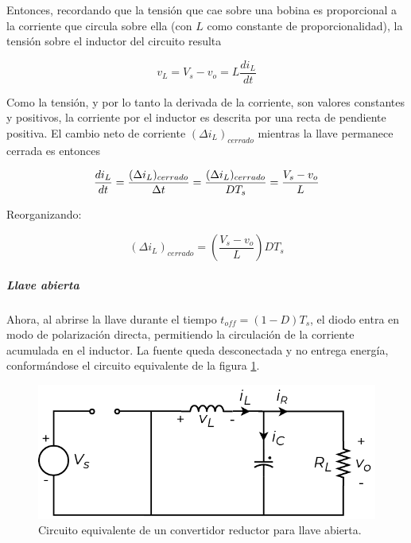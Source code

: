Entonces, recordando que la tensión que cae sobre una bobina es proporcional a la corriente que circula sobre ella (con $L$ como constante de proporcionalidad), la tensión sobre el inductor del circuito resulta

\begin{equation}\label{ec_tensionL_cerrada}
    v_L = V_s - v_o = L\frac{di_L}{dt}
\end{equation}

Como la tensión, y por lo tanto la derivada de la corriente, son valores constantes y positivos, la corriente por el inductor es descrita por una recta de pendiente positiva. El cambio neto de corriente $(\Delta i_L)_{cerrado}$ mientras la llave permanece cerrada es entonces

\begin{equation*}
    \frac{di_L}{dt} = \frac{(\Delta i_L)_{cerrado}}{\Delta t} = \frac{(\Delta i_L)_{cerrado}}{DT_s} = \frac{V_s - v_o}{L}\\
\end{equation*}

Reorganizando:

\begin{equation}\label{deltaiL_cerrada}
    \boxed{
        (\Delta i_L)_{cerrado} = \left(\frac{V_s - v_o}{L}\right)DT_s
    }
\end{equation}

\subparagraph{Llave abierta}

Ahora, al abrirse la llave durante el tiempo $t_{off} = (1-D)T_s$, el diodo entra en modo de polarización directa, permitiendo la circulación de la corriente acumulada en el inductor. La fuente queda desconectada y no entrega energía, conformándose el circuito equivalente de la figura \ref{reductor_llave_abierta}.\\

\begin{figure}[h]
    \centering
    \includegraphics[scale=0.6]{Imagenes/Reductor Llave Abierta.pdf}
    \caption{Circuito equivalente de un convertidor reductor para llave abierta.}
    \label{reductor_llave_abierta}
\end{figure}

